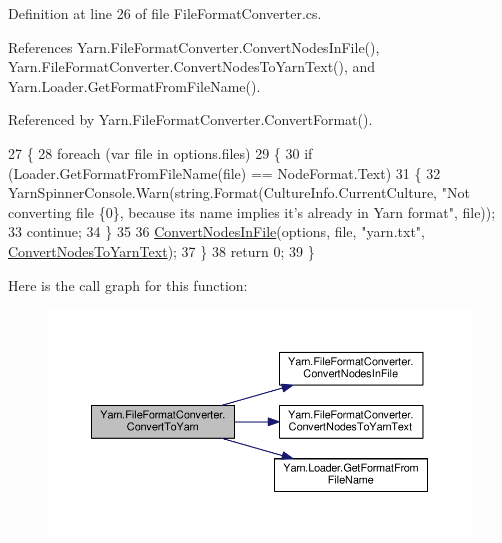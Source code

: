 Definition at line 26 of file File\-Format\-Converter.\-cs.



References Yarn.\-File\-Format\-Converter.\-Convert\-Nodes\-In\-File(), Yarn.\-File\-Format\-Converter.\-Convert\-Nodes\-To\-Yarn\-Text(), and Yarn.\-Loader.\-Get\-Format\-From\-File\-Name().



Referenced by Yarn.\-File\-Format\-Converter.\-Convert\-Format().


\begin{DoxyCode}
27         \{
28             \textcolor{keywordflow}{foreach} (var file \textcolor{keywordflow}{in} options.files)
29             \{
30                 \textcolor{keywordflow}{if} (Loader.GetFormatFromFileName(file) == NodeFormat.Text)
31                 \{
32                     YarnSpinnerConsole.Warn(string.Format(CultureInfo.CurrentCulture, \textcolor{stringliteral}{"Not converting file
       \{0\}, because its name implies it's already in Yarn format"}, file));
33                     \textcolor{keywordflow}{continue};
34                 \}
35 
36                 \hyperlink{a00100_aa72838be584177b5592c31d73c0febdb}{ConvertNodesInFile}(options, file, \textcolor{stringliteral}{"yarn.txt"}, 
      \hyperlink{a00100_a282f283f02c9b1d3e53d813ec2f35233}{ConvertNodesToYarnText});
37             \}
38             \textcolor{keywordflow}{return} 0;
39         \}
\end{DoxyCode}


Here is the call graph for this function\-:
\nopagebreak
\begin{figure}[H]
\begin{center}
\leavevmode
\includegraphics[width=350pt]{a00100_a1e6cd39b0c813f21da278367dcff76d2_cgraph}
\end{center}
\end{figure}




